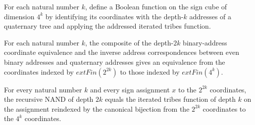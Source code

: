 \begin{definition}
\label{FABL.iteratedTribesTwoTwo}
\leanok
{}
For each natural number $k$, define a Boolean function on the sign cube of dimension
$4^k$ by identifying its coordinates with the depth-$k$ addresses of a quaternary tree
and applying the addressed iterated tribes function.
\end{definition}

\begin{definition}
\label{FABL.recursiveNandEvenTribesCoordinateEquiv}
\leanok
{}
For each natural number $k$, the composite of the depth-$2k$ binary-address coordinate
equivalence and the inverse address correspondences between even binary addresses and
quaternary addresses gives an equivalence from the coordinates indexed by
$	ext{Fin}(2^{2k})$ to those indexed by $	ext{Fin}(4^k)$.
\end{definition}

\begin{theorem}
\label{FABL.recursiveNAND_even_eq_iteratedTribesTwoTwo}
\leanok
{}
For every natural number $k$ and every sign assignment $x$ to the $2^{2k}$ coordinates,
the recursive NAND of depth $2k$ equals the iterated tribes function of depth $k$ on the
assignment reindexed by the canonical bijection from the $2^{2k}$ coordinates to the
$4^k$ coordinates.
\end{theorem}
